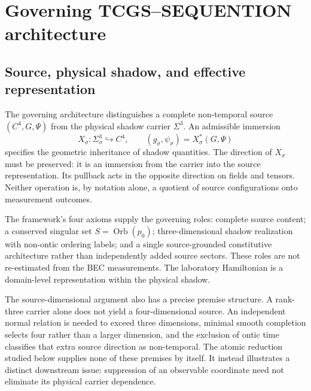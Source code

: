 \documentclass[11pt,a4paper]{article}
\theoremstyle{definition}
\theoremstyle{remark}
\begin{document}
\section{Governing TCGS--SEQUENTION architecture}
\label{sec:framework}
\subsection{Source, physical shadow, and effective representation}
The governing architecture distinguishes a complete non-temporal source $(C^4,G,\Psi)$ from the physical shadow carrier $\Sigma^3$. An admissible immersion
\begin{equation}
 X_\sigma:\Sigma^3_\sigma\hookrightarrow C^4,
 \qquad (g_\sigma,\psi_\sigma)=X_\sigma^*(G,\Psi)
 \label{eq:pullback}
\end{equation}
specifies the geometric inheritance of shadow quantities. The direction of $X_\sigma$ must be preserved: it is an immersion from the carrier into the source representation. Its pullback acts in the opposite direction on fields and tensors. Neither operation is, by notation alone, a quotient of source configurations onto measurement outcomes.\cite{foundation}

The framework's four axioms supply the governing roles: complete source content; a conserved singular set $S=\operatorname{Orb}(p_0)$; three-dimensional shadow realization with non-ontic ordering labels; and a single source-grounded constitutive architecture rather than independently added source sectors. These roles are not re-estimated from the BEC measurements. The laboratory Hamiltonian is a domain-level representation within the physical shadow.\cite{foundation,logical}

The source-dimensional argument also has a precise premise structure. A rank-three carrier alone does not yield a four-dimensional source. An independent normal relation is needed to exceed three dimensions, minimal smooth completion selects four rather than a larger dimension, and the exclusion of ontic time classifies that extra source direction as non-temporal. The atomic reduction studied below supplies none of these premises by itself. It instead illustrates a distinct downstream issue: suppression of an observable coordinate need not eliminate its physical carrier dependence.\cite{logical,planck}
\end{document}
